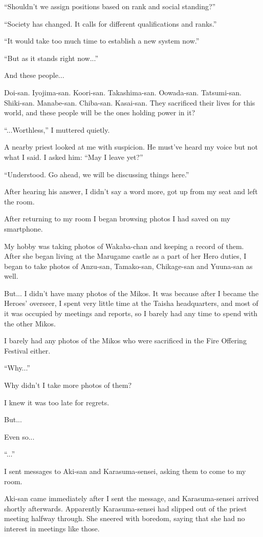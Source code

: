 ``Shouldn't we assign positions based on rank and social standing?''

``Society has changed. It calls for different qualifications and ranks.''

``It would take too much time to establish a new system now.''

``But as it stands right now...''

And these people...

Doi-san. Iyojima-san. Koori-san. Takashima-san. Oowada-san. Tatsumi-san. Shiki-san. Manabe-san. Chiba-san. Kasai-san. They sacrificed their lives for this world, and these people will be the ones holding power in it?

``...Worthless,'' I muttered quietly.

A nearby priest looked at me with suspicion. He must've heard my voice but not what I said. I asked him: ``May I leave yet?''

``Understood. Go ahead, we will be discussing things here.''

After hearing his answer, I didn't say a word more, got up from my seat and left the room.

After returning to my room I began browsing photos I had saved on my smartphone.

My hobby was taking photos of Wakaba-chan and keeping a record of them. After she began living at the Marugame castle as a part of her Hero duties, I began to take photos of Anzu-san, Tamako-san, Chikage-san and Yuuna-san as well.

But... I didn't have many photos of the Mikos. It was because after I became the Heroes' overseer, I spent very little time at the Taisha headquarters, and most of it was occupied by meetings and reports, so I barely had any time to spend with the other Mikos.

I barely had any photos of the Mikos who were sacrificed in the Fire Offering Festival either.

``Why...''

Why didn't I take more photos of them?

I knew it was too late for regrets.

But...

Even so...

``...''

I sent messages to Aki-san and Karasuma-sensei, asking them to come to my room.

Aki-san came immediately after I sent the message, and Karasuma-sensei arrived shortly afterwards. Apparently Karasuma-sensei had slipped out of the priest meeting halfway through. She sneered with boredom, saying that she had no interest in meetings like those.

